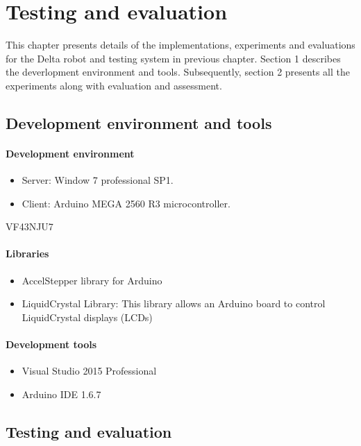 \chapter{Testing and evaluation}

This chapter presents details of the implementations, experiments and evaluations for the Delta robot and testing system in previous chapter. Section 1 describes the deverlopment environment and tools. Subsequently, section 2 presents all the experiments along with evaluation and assessment.

\section{Development environment and tools}
\subsubsection{Development environment}
\begin{itemize}
		\item Server: Window 7 professional SP1.
		\item Client: Arduino MEGA 2560 R3 microcontroller.
\end{itemize}VF43NJU7	
\subsubsection{Libraries}
\begin{itemize}
		\item AccelStepper library for Arduino\cite{accelstepper_lib_thesis}
		\item LiquidCrystal Library: This library allows an Arduino board to control LiquidCrystal displays (LCDs)\cite{liquidcrystal_lib_thesis}
\end{itemize}
\subsubsection{Development tools}
\begin{itemize}
		\item Visual Studio 2015 Professional
		\item Arduino IDE 1.6.7\cite{arduino_ide_thesis}
\end{itemize}

\section{Testing and evaluation}

